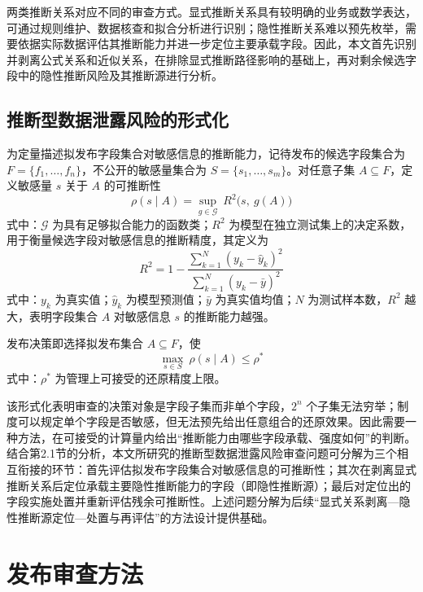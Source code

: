 \documentclass[UTF8,zihao=5,twoside,fontset=none]{ctexart}
\begin{document}
两类推断关系对应不同的审查方式。显式推断关系具有较明确的业务或数学表达，可通过规则维护、数据核查和拟合分析进行识别；隐性推断关系难以预先枚举，需要依据实际数据评估其推断能力并进一步定位主要承载字段。因此，本文首先识别并剥离公式关系和近似关系，在排除显式推断路径影响的基础上，再对剩余候选字段中的隐性推断风险及其推断源进行分析。

\subsection{推断型数据泄露风险的形式化}

为定量描述拟发布字段集合对敏感信息的推断能力，记待发布的候选字段集合为 $F=\{f_1,\dots,f_n\}$，不公开的敏感量集合为 $S=\{s_1,\dots,s_m\}$。对任意子集 $A\subseteq F$，定义敏感量 $s$ 关于 $A$ 的可推断性
\begin{equation}
\rho(s\mid A)=\sup_{g\in\mathcal{G}}\ R^2\big(s,\ g(A)\big)
\end{equation}
式中：$\mathcal{G}$ 为具有足够拟合能力的函数类；$R^2$ 为模型在独立测试集上的决定系数，用于衡量候选字段对敏感信息的推断精度，其定义为
\begin{equation}
R^2=1-\frac{\sum_{k=1}^{N}(y_k-\hat y_k)^2}{\sum_{k=1}^{N}(y_k-\bar y)^2}
\end{equation}
式中：$y_k$ 为真实值；$\hat y_k$ 为模型预测值；$\bar y$ 为真实值均值；$N$ 为测试样本数，$R^2$ 越大，表明字段集合 $A$ 对敏感信息 $s$ 的推断能力越强。

发布决策即选择拟发布集合 $A\subseteq F$，使
\begin{equation}
\max_{s\in S}\ \rho(s\mid A)\le \rho^{\ast}
\end{equation}
式中：$\rho^{\ast}$ 为管理上可接受的还原精度上限。

该形式化表明审查的决策对象是字段子集而非单个字段，$2^n$ 个子集无法穷举；制度可以规定单个字段是否敏感，但无法预先给出任意组合的还原效果。因此需要一种方法，在可接受的计算量内给出“推断能力由哪些字段承载、强度如何”的判断。结合第2.1节的分析，本文所研究的推断型数据泄露风险审查问题可分解为三个相互衔接的环节：首先评估拟发布字段集合对敏感信息的可推断性；其次在剥离显式推断关系后定位承载主要隐性推断能力的字段（即隐性推断源）；最后对定位出的字段实施处置并重新评估残余可推断性。上述问题分解为后续“显式关系剥离—隐性推断源定位—处置与再评估”的方法设计提供基础。

\section{发布审查方法}
\end{document}

